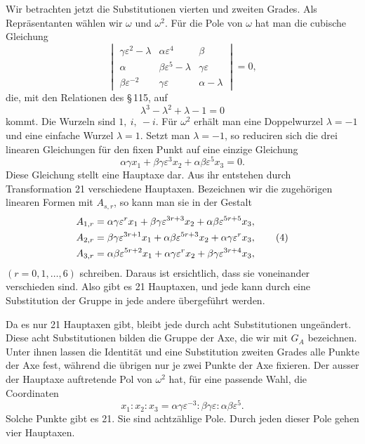 \documentclass[11pt]{article}
\providecommand{\eps}{\varepsilon}
\providecommand{\eps}{\varepsilon}
\begin{document}
Wir betrachten jetzt die Substitutionen vierten und zweiten Grades. Als Repräsentanten wählen wir \(\omega\) und \(\omega^2\). Für die Pole von \(\omega\) hat man die cubische Gleichung
\begin{equation}
\begin{vmatrix}
\gamma\eps^2-\lambda&\alpha\eps^4&\beta\\
\alpha&\beta\eps^5-\lambda&\gamma\eps\\
\beta\eps^{-2}&\gamma\eps&\alpha-\lambda
\end{vmatrix}=0,
\tag{1}
\end{equation}
die, mit den Relationen des \S\,115, auf
\begin{equation}
\lambda^3-\lambda^2+\lambda-1=0
\tag{2}
\end{equation}
kommt. Die Wurzeln sind \(1,\ i,\ -i\). Für \(\omega^2\) erhält man eine Doppelwurzel \(\lambda=-1\) und eine einfache Wurzel \(\lambda=1\). Setzt man \(\lambda=-1\), so reduciren sich die drei linearen Gleichungen für den fixen Punkt auf eine einzige Gleichung
\begin{equation}
\alpha\gamma x_1+\beta\gamma\eps^3x_2+\alpha\beta\eps^5x_3=0.
\tag{3}
\end{equation}
Diese Gleichung stellt eine Hauptaxe dar. Aus ihr entstehen durch Transformation 21 verschiedene Hauptaxen. Bezeichnen wir die zugehörigen linearen Formen mit \(A_{s,r}\), so kann man sie in der Gestalt
\begin{align}
A_{1,r}&=\alpha\gamma\eps^{r}x_1+\beta\gamma\eps^{3r+3}x_2+\alpha\beta\eps^{5r+5}x_3,\notag\\
A_{2,r}&=\beta\gamma\eps^{3r+1}x_1+\alpha\beta\eps^{5r+3}x_2+\alpha\gamma\eps^{r}x_3,\tag{4}\\
A_{3,r}&=\alpha\beta\eps^{5r+2}x_1+\alpha\gamma\eps^{r}x_2+\beta\gamma\eps^{3r+4}x_3,\notag
\end{align}
\((r=0,1,\ldots,6)\) schreiben. Daraus ist ersichtlich, dass sie voneinander verschieden sind. Also gibt es 21 Hauptaxen, und jede kann durch eine Substitution der Gruppe in jede andere übergeführt werden.

Da es nur 21 Hauptaxen gibt, bleibt jede durch acht Substitutionen ungeändert. Diese acht Substitutionen bilden die Gruppe der Axe, die wir mit \(G_A\) bezeichnen. Unter ihnen lassen die Identität und eine Substitution zweiten Grades alle Punkte der Axe fest, während die übrigen nur je zwei Punkte der Axe fixieren. Der ausser der Hauptaxe auftretende Pol von \(\omega^2\) hat, für eine passende Wahl, die Coordinaten
\begin{equation}
x_1:x_2:x_3=\alpha\gamma\eps^{-3}:\beta\gamma\eps:\alpha\beta\eps^5.
\tag{5}
\end{equation}
Solche Punkte gibt es 21. Sie sind achtzählige Pole. Durch jeden dieser Pole gehen vier Hauptaxen.
\end{document}
